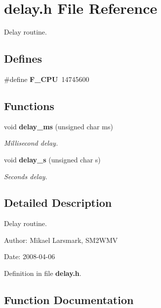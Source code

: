 \section{delay.h File Reference}
\label{delay_8h}
Delay routine.  


\subsection*{Defines}
\begin{CompactItemize}
\item 
\#define \textbf{F\_\-CPU}~14745600\label{delay_8h_43bafb28b29491ec7f871319b5a3b2f8}

\end{CompactItemize}
\subsection*{Functions}
\begin{CompactItemize}
\item 
void {\bf delay\_\-ms} (unsigned char ms)
\begin{CompactList}\small\item\em Millisecond delay. \item\end{CompactList}\item 
void {\bf delay\_\-s} (unsigned char s)
\begin{CompactList}\small\item\em Seconds delay. \item\end{CompactList}\end{CompactItemize}


\subsection{Detailed Description}
Delay routine. 

\begin{Desc}
\item[Author:]Mikael Larsmark, SM2WMV \end{Desc}
\begin{Desc}
\item[Date:]2008-04-06 \end{Desc}


Definition in file {\bf delay.h}.

\subsection{Function Documentation}
